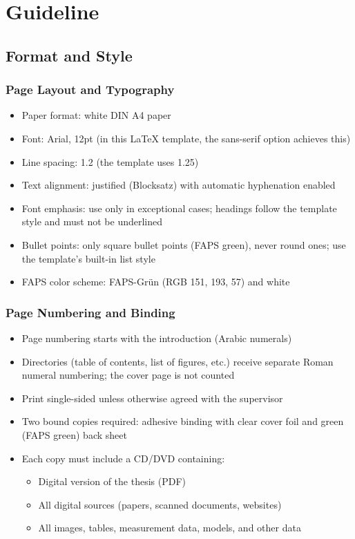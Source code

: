 \setcounter{chapter}{-2}
\chapter{Guideline}\label{ch:guideline}

\section{Format and Style}

\subsection{Page Layout and Typography}
\begin{itemize}
    \item Paper format: white DIN A4 paper
    \item Font: Arial, 12pt (in this LaTeX template, the sans-serif option achieves this)
    \item Line spacing: 1.2 (the template uses 1.25)
    \item Text alignment: justified (Blocksatz) with automatic hyphenation enabled
    \item Font emphasis: use only in exceptional cases; headings follow the template style and must not be underlined
    \item Bullet points: only square bullet points (FAPS green), never round ones; use the template's built-in list style
    \item FAPS color scheme: FAPS-Grün (RGB 151, 193, 57) and white
\end{itemize}

\subsection{Page Numbering and Binding}
\begin{itemize}
    \item Page numbering starts with the introduction (Arabic numerals)
    \item Directories (table of contents, list of figures, etc.) receive separate Roman numeral numbering; the cover page is not counted
    \item Print single-sided unless otherwise agreed with the supervisor
    \item Two bound copies required: adhesive binding with clear cover foil and green (FAPS green) back sheet
    \item Each copy must include a CD/DVD containing:
    \begin{itemize}
        \item Digital version of the thesis (PDF)
        \item All digital sources (papers, scanned documents, websites)
        \item All images, tables, measurement data, models, and other data
    \end{itemize}
\end{itemize}

